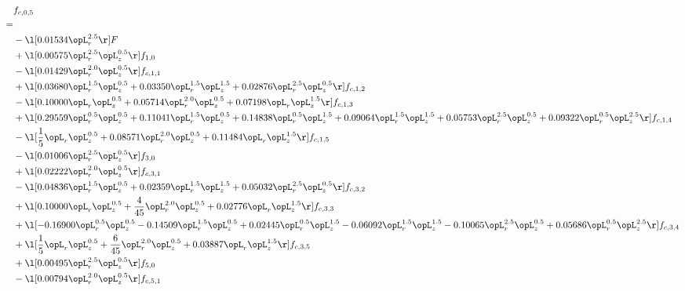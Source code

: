 \begin{alignat}{2} 
\label{eq:f_05_2} 
& f_{c,0,5} \nonumber \\ 
 = \\ 
& - \l[  0.01534 \opL_r^{2.5}  \r] F \nonumber \\ 
& + \l[  0.00575 \opL_r^{2.5} \opL_z^{0.5}  \r] f_{1,0} \nonumber \\ 
& - \l[  0.01429 \opL_r^{2.0} \opL_z^{0.5}  \r] f_{c,1,1} \nonumber \\ 
& + \l[  0.03680 \opL_r^{1.5} \opL_z^{0.5} +  0.03350 \opL_r^{1.5} \opL_z^{1.5} +  0.02876 \opL_r^{2.5} \opL_z^{0.5}  \r] f_{c,1,2} \nonumber \\ 
& - \l[  0.10000 \opL_r \opL_z^{0.5} +  0.05714 \opL_r^{2.0} \opL_z^{0.5} +  0.07198 \opL_r \opL_z^{1.5}  \r] f_{c,1,3} \nonumber \\ 
& + \l[  0.29559 \opL_r^{0.5} \opL_z^{0.5} +  0.11041 \opL_r^{1.5} \opL_z^{0.5} +  0.14838 \opL_r^{0.5} \opL_z^{1.5} +  0.09064 \opL_r^{1.5} \opL_z^{1.5} +  0.05753 \opL_r^{2.5} \opL_z^{0.5} +  0.09322 \opL_r^{0.5} \opL_z^{2.5}  \r] f_{c,1,4} \nonumber \\ 
& - \l[ \frac{1}{5} \opL_r \opL_z^{0.5} +  0.08571 \opL_r^{2.0} \opL_z^{0.5} +  0.11484 \opL_r \opL_z^{1.5}  \r] f_{c,1,5} \nonumber \\ 
& - \l[  0.01006 \opL_r^{2.5} \opL_z^{0.5}  \r] f_{3,0} \nonumber \\ 
& + \l[  0.02222 \opL_r^{2.0} \opL_z^{0.5}  \r] f_{c,3,1} \nonumber \\ 
& - \l[  0.04836 \opL_r^{1.5} \opL_z^{0.5} +  0.02359 \opL_r^{1.5} \opL_z^{1.5} +  0.05032 \opL_r^{2.5} \opL_z^{0.5}  \r] f_{c,3,2} \nonumber \\ 
& + \l[  0.10000 \opL_r \opL_z^{0.5} + \frac{4}{45} \opL_r^{2.0} \opL_z^{0.5} +  0.02776 \opL_r \opL_z^{1.5}  \r] f_{c,3,3} \nonumber \\ 
& + \l[  -0.16900 \opL_r^{0.5} \opL_z^{0.5}   -0.14509 \opL_r^{1.5} \opL_z^{0.5} +  0.02445 \opL_r^{0.5} \opL_z^{1.5}   -0.06092 \opL_r^{1.5} \opL_z^{1.5}   -0.10065 \opL_r^{2.5} \opL_z^{0.5} +  0.05686 \opL_r^{0.5} \opL_z^{2.5}  \r] f_{c,3,4} \nonumber \\ 
& + \l[ \frac{1}{5} \opL_r \opL_z^{0.5} + \frac{6}{45} \opL_r^{2.0} \opL_z^{0.5} +  0.03887 \opL_r \opL_z^{1.5}  \r] f_{c,3,5} \nonumber \\ 
& + \l[  0.00495 \opL_r^{2.5} \opL_z^{0.5}  \r] f_{5,0} \nonumber \\ 
& - \l[  0.00794 \opL_r^{2.0} \opL_z^{0.5}  \r] f_{c,5,1} \nonumber \\ 

\end{alignat}
